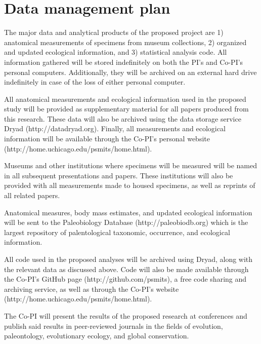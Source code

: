 \section{Data management plan}

The major data and analytical products of the proposed project are 1) anatomical measurements of specimens from museum collections, 2) organized and updated ecological information, and 3) statistical analysis code. All information gathered will be stored indefinitely on both the PI's and Co-PI's personal computers. Additionally, they will be archived on an external hard drive indefinitely in case of the loss of either personal computer.

All anatomical measurements and ecological information used in the proposed study will be provided as supplementary material for all papers produced from this research. These data will also be archived using the data storage service Dryad (http://datadryad.org). Finally, all measurements and ecological information will be available through the Co-PI's personal website (http://home.uchicago.edu/psmits/home.html).

Museums and other institutions where specimens will be measured will be named in all subsequent presentations and papers. These institutions will also be provided with all measurements made to housed specimens, as well as reprints of all related papers.

Anatomical measures, body mass estimates, and updated ecological information will be sent to the Paleobiology Database (http://paleobiodb.org) which is the largest repository of palentological taxonomic, occurrence, and ecological information. 

All code used in the proposed analyses will be archived using Dryad, along with the relevant data as discussed above. Code will also be made available through the Co-PI's GitHub page (http://github.com/psmits), a free code sharing and archiving service, as well as through the Co-PI's website (http://home.uchicago.edu/psmits/home.html).

The Co-PI will present the results of the proposed research at conferences and publish said results in peer-reviewed journals in the fields of evolution, paleontology, evolutionary ecology, and global conservation.
